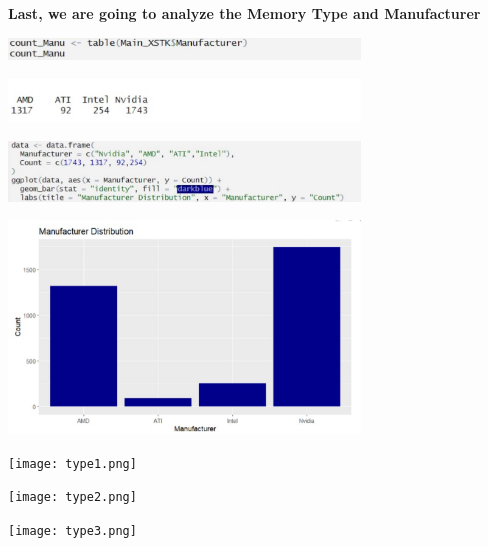 \textbf{Last, we are going to analyze the Memory Type and Manufacturer}

\begin{center}
    \includegraphics[width=0.7\textwidth]{manu.png}
\end{center}
\begin{center}
    \includegraphics[width=0.7\textwidth]{manu1.png}
\end{center}
\begin{center}
    \includegraphics[width=0.7\textwidth]{manu2.png}
\end{center}
\begin{center}
    \includegraphics[width=0.7\textwidth]{manu3.png}
\end{center}
\begin{center}
    \texttt{[image: type1.png]}
\end{center}
\begin{center}
    \texttt{[image: type2.png]}
\end{center}
\begin{center}
    \texttt{[image: type3.png]}
\end{center}

